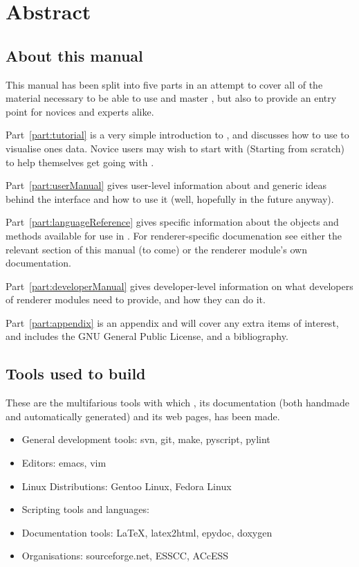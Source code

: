 
\chapter*{Abstract}

\section*{About this manual}

This manual has been split into five parts in an attempt to cover all of the
material necessary to be able to use and master \pyvisi, but also to provide an
entry point for novices and experts alike.

Part~\ref{part:tutorial} is a very simple introduction to \pyvisi, and
discusses how to use \pyvisi to visualise ones data.  Novice users may wish to
start with  (Starting from scratch) to help
themselves get going with \pyvisi.  

Part~\ref{part:userManual} gives user-level information about \pyvisi and
generic ideas behind the interface and how to use it (well, hopefully in the
future anyway).

Part~\ref{part:languageReference} gives specific information about the objects
and methods available for use in \pyvisi.  For renderer-specific documenation
see either the relevant section of this manual (to come) or the renderer
module's own documentation.

Part~\ref{part:developerManual} gives developer-level information on what
developers of renderer modules need to provide, and how they can do it.

Part~\ref{part:appendix} is an appendix and will cover any extra items of
interest, and includes the GNU General Public License, and a bibliography.

\section*{Tools used to build \pyvisi}

These are the multifarious tools with which \pyvisi, its documentation (both
handmade and automatically generated) and its web pages, has been made.

\begin{itemize}
\item General development tools: svn, git, make, pyscript, pylint
\item Editors: emacs, vim
\item Linux Distributions: Gentoo Linux, Fedora Linux
\item Scripting tools and languages: ~\cite{web:python}
\item Documentation tools: \LaTeX, latex2html, epydoc, doxygen
\item Organisations: sourceforge.net, ESSCC, ACcESS
\end{itemize}

